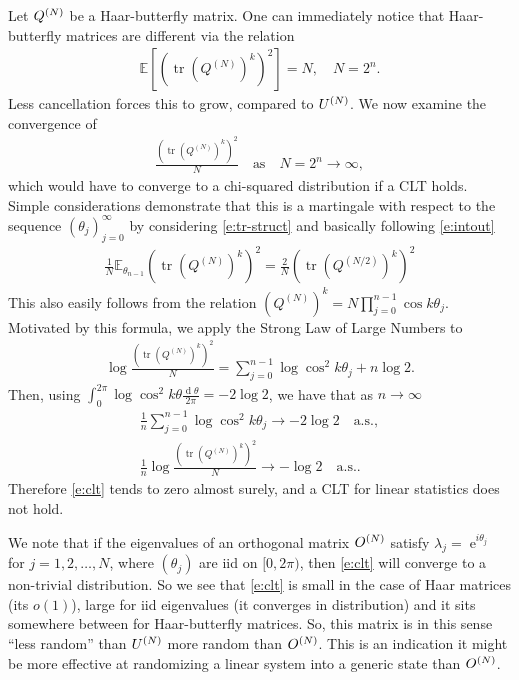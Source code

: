 \documentclass{amsart}
\theoremstyle{definition}
\theoremstyle{remark}
\numberwithin{equation}{section}
\DeclareMathOperator{\D}{d}
\DeclareMathOperator{\E}{e}
\DeclareMathOperator{\tr}{tr}
\begin{document}
Let $Q^{(N)}$ be a Haar-butterfly matrix. One can immediately notice that Haar-butterfly matrices are different via the relation
\begin{align}
\mathbb E \left[ \left( \tr \left( Q^{(N)} \right)^k \right)^2 \right] = N, \quad N = 2^n.
\end{align}
Less cancellation forces this to grow, compared to $U^{(N)}$.  We now examine the convergence of
\begin{align}\label{e:clt}
 \frac{\left(\tr \left(Q^{(N)} \right)^k \right)^2}{N} \quad \text{as} \quad N = 2^n \to \infty,
\end{align}
which would have to converge to a chi-squared distribution if a CLT holds.  Simple considerations demonstrate that this is a martingale with respect to the sequence $(\theta_j)_{j=0}^\infty$ by considering \eqref{e:tr-struct} and basically following \eqref{e:intout}
\begin{align}
\frac{1}{N} \mathbb E_{\theta_{n-1}} \left( \tr\left(Q^{(N)} \right)^k \right)^2  =  \frac{2}{N} \left( \tr \left(Q^{(N/2)} \right)^k \right)^2
\end{align}
This also easily follows from the relation $\left(Q^{(N)} \right)^k = N \prod_{j=0}^{n-1} \cos k \theta_j$.   Motivated by this formula, we apply the Strong Law of Large Numbers to
\begin{align}%
  \log \frac{\left( \tr \left(Q^{(N)} \right)^k\right)^2}{N} = \sum_{j=0}^{n-1} \log \cos^2 k\theta_j + n \log 2.
\end{align}
Then, using $\int_{0}^{2\pi} \log \cos^2 k\theta \frac{\D \theta}{2 \pi} = - 2 \log 2$, we have that as $n \to \infty$
\begin{align}
  \frac{1}{n} \sum_{j=0}^{n-1} \log \cos^2 k\theta_j \to - 2 \log 2 \quad \text{a.s.},\\
  \frac{1}{n} \log \frac{\left(\tr \left(Q^{(N)} \right)^k  \right)^2}{N} \to - \log 2 \quad \text{a.s.}.
\end{align}
Therefore \eqref{e:clt} tends to zero almost surely, and a CLT for linear statistics does not hold.

We note that if the eigenvalues of an orthogonal matrix $O^{(N)}$ satisfy $\lambda_j = \E^{i \theta_j}$ for $j = 1,2,\ldots,N$, where $(\theta_j)$ are iid on $[0,2\pi)$, then \eqref{e:clt} will converge to a non-trivial distribution.  So we see that \eqref{e:clt} is small in the case of Haar matrices (its $o(1)$), large for iid eigenvalues (it converges in distribution) and it sits somewhere between for Haar-butterfly matrices.  So, this matrix is in this sense ``less random'' than $U^{(N)}$ more random than $O^{(N)}$.  This is an indication it might be more effective at randomizing a linear system into a generic state than $O^{(N)}$.
\end{document}

